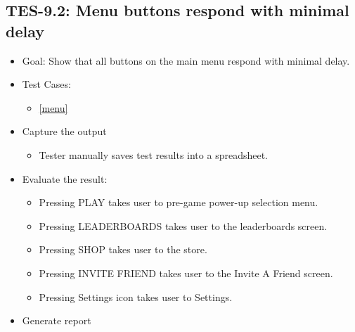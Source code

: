 \subsection{TES-9.2: Menu buttons respond with minimal delay}
\begin{itemize}
\item Goal: Show that all buttons on the main menu respond with minimal delay.
\item Test Cases: 
\begin{itemize}
\item \ref{menu}
\end{itemize}
\item Capture the output
\begin{itemize}
\item Tester manually saves test results into a spreadsheet.
\end{itemize}
\item Evaluate the result: 

\begin{itemize}
\item Pressing PLAY takes user to pre-game power-up selection menu.
\item Pressing LEADERBOARDS takes user to the leaderboards screen.
\item Pressing SHOP takes user to the store.
\item Pressing INVITE FRIEND takes user to the Invite A Friend screen.
\item Pressing Settings icon takes user to Settings.
\end{itemize}
\item Generate report
\end{itemize}



